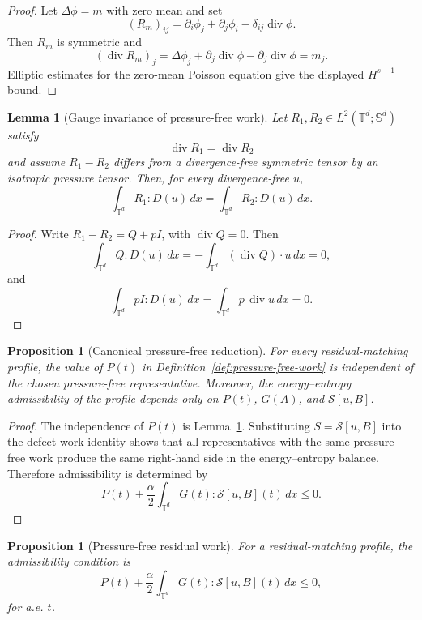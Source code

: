 \documentclass[11pt]{article}
\numberwithin{equation}{section}
\newtheorem{proposition}[theorem]{Proposition}
\newtheorem{lemma}[theorem]{Lemma}
\newcommand{\T}{\mathbb T}
\newcommand{\Id}{I}
\newcommand{\Sym}{\mathbb S}
\newcommand{\divv}{\operatorname{div}}
\begin{document}
\begin{proof}
Let \(\Delta\phi=m\) with zero mean and set
\[
  (R_m)_{ij}=\partial_i\phi_j+\partial_j\phi_i-\delta_{ij}\divv\phi.
\]
Then \(R_m\) is symmetric and
\[
  (\divv R_m)_j
  =\Delta\phi_j+\partial_j\divv\phi-\partial_j\divv\phi
  =m_j .
\]
Elliptic estimates for the zero-mean Poisson equation give the displayed
\(H^{s+1}\) bound.
\end{proof}

\begin{lemma}[Gauge invariance of pressure-free work]
\label{lem:gauge}
Let \(R_1,R_2\in L^2(\T^d;\Sym^d)\) satisfy
\[
  \divv R_1=\divv R_2
\]
and assume \(R_1-R_2\) differs from a divergence-free symmetric tensor by an
isotropic pressure tensor.  Then, for every divergence-free \(u\),
\[
  \int_{\T^d}R_1:D(u)\,dx
  =
  \int_{\T^d}R_2:D(u)\,dx .
\]
\end{lemma}

\begin{proof}
Write \(R_1-R_2=Q+p\Id\), with \(\divv Q=0\).  Then
\[
  \int_{\T^d}Q:D(u)\,dx
  =
  -\int_{\T^d}(\divv Q)\cdot u\,dx=0,
\]
and
\[
  \int_{\T^d}p\Id:D(u)\,dx
  =
  \int_{\T^d}p\,\divv u\,dx=0.
\]
\end{proof}

\begin{proposition}[Canonical pressure-free reduction]
\label{prop:canonical-pressure-free}
For every residual-matching profile, the value of \(P(t)\) in
Definition~\ref{def:pressure-free-work} is independent of the chosen
pressure-free representative.  Moreover, the energy--entropy admissibility of
the profile depends only on \(P(t)\), \(G(A)\), and \(\mathcal S[u,B]\).
\end{proposition}

\begin{proof}
The independence of \(P(t)\) is Lemma~\ref{lem:gauge}.  Substituting
\(S=\mathcal S[u,B]\) into the defect-work identity shows that all representatives
with the same pressure-free work produce the same right-hand side in the
energy--entropy balance.  Therefore admissibility is determined by
\[
  P(t)+\frac{\alpha}{2}
  \int_{\T^d}G(t):\mathcal S[u,B](t)\,dx\le0 .
\]
\end{proof}

\begin{proposition}[Pressure-free residual work]
\label{prop:pressure-free}
For a residual-matching profile, the admissibility condition is
\[
  P(t)+\frac{\alpha}{2}
  \int_{\T^d}G(t):\mathcal S[u,B](t)\,dx\le0,
  \label{eq:pressure-free}
\]
for a.e. \(t\).
\end{proposition}
\end{document}
